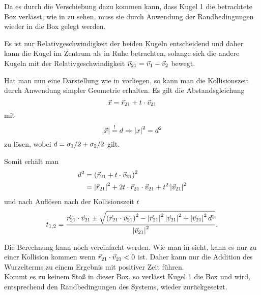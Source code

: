 Da es durch die Verschiebung dazu kommen kann, dass Kugel 1 die betrachtete Box verlässt, wie in  zu sehen, muss sie durch Anwendung der Randbedingungen wieder in die Box gelegt werden.



Es ist nur Relativgeschwindigkeit der beiden Kugeln entscheidend und daher kann die Kugel im Zentrum als in Ruhe betrachten, solange sich die andere Kugeln mit der Relativgeschwindigkeit $\vec{v}_{21}=\vec{v}_1-\vec{v}_2$ bewegt.
 


Hat man nun eine Darstellung wie in  vorliegen, so kann man die Kollisionszeit durch Anwendung simpler Geometrie erhalten.
Es gilt die Abstandsgleichung 
\begin{equation}
	\vec{x} = \vec{r}_{21} + t\cdot\vec{v}_{21}
\end{equation}
mit 
\begin{equation}
	\left|\vec{x}\right| \overset{!}{=} d \Rightarrow \left|x\right|^2 = d^2
\end{equation}
zu lösen, wobei $d=\sigma_1/2 + \sigma_2/2$ gilt.

Somit erhält man
\begin{align}
	d^2	&= \left(\vec{r}_{21} + t\cdot\vec{v}_{21} \right)^2 \\
			&= \left|\vec{r}_{21}\right|^2 + 2t\cdot\vec{r}_{21}\cdot\vec{v}_{21} + t^2\left|\vec{v}_{21}\right|^2
\end{align}
und nach Auflösen nach der Kollisionszeit $t$
\begin{equation}
	t_{1,2}=\frac{\vec{r}_{21}\cdot\vec{v}_{21} \pm \sqrt{\left(\vec{r}_{21}\cdot\vec{v}_{21}\right)^2 - \left|\vec{r}_{21}\right|^2\left|\vec{v}_{21}\right|^2 + \left|\vec{v}_{21}\right|^2d^2}}{\left|\vec{v}_{21}\right|^2}.
\end{equation}

Die Berechnung kann noch vereinfacht werden. Wie man in  sieht, kann es nur zu einer Kollision kommen wenn $\vec{r}_{21}\cdot\vec{v}_{21} < 0$ ist. Daher kann nur die Addition des Wurzelterms zu einem Ergebnis mit positiver Zeit führen.\\
Kommt es zu keinem Stoß in dieser Box, so verlässt Kugel 1 die Box und wird, entsprechend den Randbedingungen des Systems, wieder zurückgesetzt.
